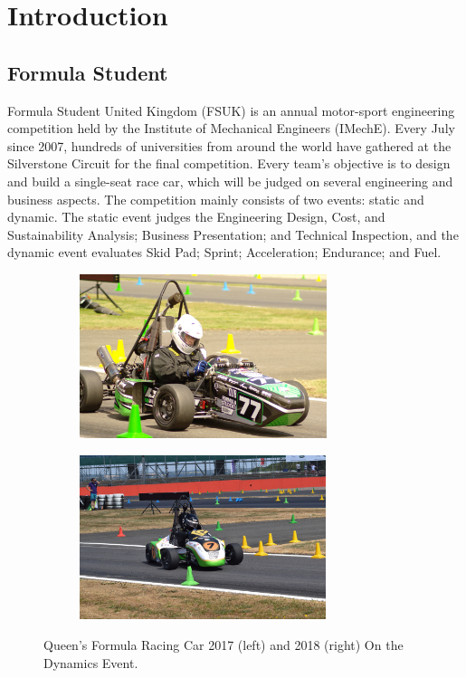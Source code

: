 \newpage
\setcounter{page}{1}
\justifying
\noindent

\section{Introduction}
\subsection{Formula Student}
Formula Student United Kingdom (FSUK) is an annual motor-sport engineering competition held by the Institute of Mechanical Engineers (IMechE). Every July since 2007, hundreds of universities from around the world have gathered at the Silverstone Circuit for the final competition. Every team's objective is to design and build a single-seat race car, which will be judged on several engineering and business aspects. The competition mainly consists of two events: static and dynamic. The static event judges the Engineering  Design,  Cost, and  Sustainability  Analysis; Business Presentation; and Technical Inspection, and the dynamic event evaluates Skid Pad; Sprint; Acceleration; Endurance; and Fuel.

\begin{figure}[!ht]
\begin{center}
%    
  \begin{subfigure}[b]{0.45\textwidth}
    \includegraphics[height=4.8cm]{Figures/QFR17PHOTO.JPG}
  \end{subfigure}
  \begin{subfigure}[b]{0.45\textwidth}
    \includegraphics[height=4.8cm]{Figures/QFR18PHOTO.jpg}
  \end{subfigure}
%  
  \caption{Queen's Formula Racing Car 2017 (left) and 2018 (right) On the Dynamics Event.}
    \label{fig:1}
\end{center}
\end{figure}

